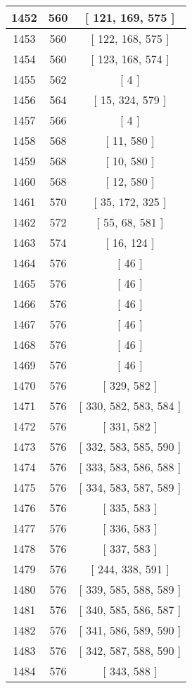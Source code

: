 \begin{center}
\begin{longtable}[H]{|| c c c ||}
\hline
1452 & 560 & [ 121, 169, 575 ] \\ 
\hline
1453 & 560 & [ 122, 168, 575 ] \\ 
\hline
1454 & 560 & [ 123, 168, 574 ] \\ 
\hline
1455 & 562 & [ 4 ] \\ 
\hline
1456 & 564 & [ 15, 324, 579 ] \\ 
\hline
1457 & 566 & [ 4 ] \\ 
\hline
1458 & 568 & [ 11, 580 ] \\ 
\hline
1459 & 568 & [ 10, 580 ] \\ 
\hline
1460 & 568 & [ 12, 580 ] \\ 
\hline
1461 & 570 & [ 35, 172, 325 ] \\ 
\hline
1462 & 572 & [ 55, 68, 581 ] \\ 
\hline
1463 & 574 & [ 16, 124 ] \\ 
\hline
1464 & 576 & [ 46 ] \\ 
\hline
1465 & 576 & [ 46 ] \\ 
\hline
1466 & 576 & [ 46 ] \\ 
\hline
1467 & 576 & [ 46 ] \\ 
\hline
1468 & 576 & [ 46 ] \\ 
\hline
1469 & 576 & [ 46 ] \\ 
\hline
1470 & 576 & [ 329, 582 ] \\ 
\hline
1471 & 576 & [ 330, 582, 583, 584 ] \\ 
\hline
1472 & 576 & [ 331, 582 ] \\ 
\hline
1473 & 576 & [ 332, 583, 585, 590 ] \\ 
\hline
1474 & 576 & [ 333, 583, 586, 588 ] \\ 
\hline
1475 & 576 & [ 334, 583, 587, 589 ] \\ 
\hline
1476 & 576 & [ 335, 583 ] \\ 
\hline
1477 & 576 & [ 336, 583 ] \\ 
\hline
1478 & 576 & [ 337, 583 ] \\ 
\hline
1479 & 576 & [ 244, 338, 591 ] \\ 
\hline
1480 & 576 & [ 339, 585, 588, 589 ] \\ 
\hline
1481 & 576 & [ 340, 585, 586, 587 ] \\ 
\hline
1482 & 576 & [ 341, 586, 589, 590 ] \\ 
\hline
1483 & 576 & [ 342, 587, 588, 590 ] \\ 
\hline
1484 & 576 & [ 343, 588 ] \\ 
\hline

\end{longtable}
\end{center}

